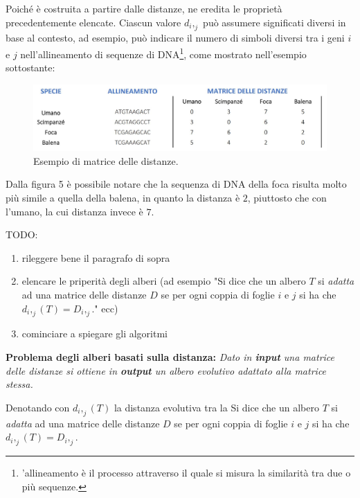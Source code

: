 Poiché è costruita a partire dalle distanze, ne eredita le proprietà precedentemente elencate.
\newline
Ciascun valore $d_i,_j$ può assumere significati diversi in base al contesto, ad esempio, può indicare il numero di simboli diversi tra i geni $i$ e $j$ nell'allineamento di sequenze di DNA\footnote{'allineamento è il processo attraverso il quale si misura la similarità tra due o più sequenze.}, come mostrato nell'esempio sottostante:
\begin{figure}[h!]
	\includegraphics[width=\linewidth]{distance_matrix_example.jpg}
 	\caption{Esempio di matrice delle distanze.}
  	\label{fig:DistanceMatrix}
\end{figure}
\newline
Dalla figura 5 è possibile notare che la sequenza di DNA della foca risulta molto più simile a quella della balena, in quanto la distanza è $2$, piuttosto che con l'umano, la cui distanza invece è $7$.
\newpage

TODO:
\begin{enumerate}
	\item rileggere bene il paragrafo di sopra
	\item elencare le priperità degli alberi  (ad esempio "Si dice che un albero $T$ si \textit{adatta} ad una matrice delle distanze $D$ se per ogni coppia di foglie $i$ e $j$ si ha che $d_i,_j(T)=D_i,_j$." ecc)
	\item cominciare a spiegare gli algoritmi
\end{enumerate}
\begin{center}
\textbf{Problema degli alberi basati sulla distanza:}
\newline
\textit{Dato in \textbf{input} una matrice delle distanze si ottiene in \textbf{output} un albero evolutivo adattato alla matrice stessa.}
\end{center}
Denotando con $d_i,_j(T)$ la distanza evolutiva tra la 
Si dice che un albero $T$ si \textit{adatta} ad una matrice delle distanze $D$ se per ogni coppia di foglie $i$ e $j$ si ha che $d_i,_j(T)=D_i,_j$.
